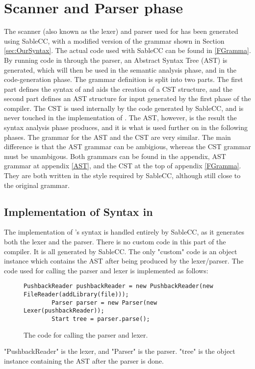 \section{Scanner and Parser phase}

The scanner (also known as the lexer) and parser used for \lang{} has been generated using SableCC, with a modified version of the grammar shown in Section \ref{sec:OurSyntax}. The actual code used with SableCC can be found in \ref{FGramma}. By running code in \lang{} through the parser, an Abstract Syntax Tree (AST) is generated, which will then be used in the semantic analysis phase, and in the code-generation phase.
The grammar definition is split into two parts. The first part defines the syntax of \lang{} and aids the creation of a CST structure, and the second part defines an AST structure for input generated by the first phase of the compiler. The CST is used internally by the code generated by SableCC, and is never touched in the implementation of \lang{}. The AST, however, is the result the syntax analysis phase produces, and it is what is used further on in the following phases. 
The grammar for the AST and the CST are very similar. The main difference is that the AST grammar can be ambigious, whereas the CST grammar must be unambigous. Both grammars can be found in the appendix, AST grammar at appendix \ref{AST}, and the CST at the top of appendix \ref{FGramma}. They are both written in the style required by SableCC, although still close to the original grammar.
\subsection{Implementation of Syntax in \lang{}}
The implementation of \lang{}'s syntax is handled entirely by SableCC, as it generates both the lexer and the parser. There is no custom code in this part of the compiler. It is all generated by SableCC. The only "custom" code is an object instance which contains the AST after being produced by the lexer/parser. The code used for calling the parser and lexer is implemented as follows:
\begin{figure}[H]
    \centering
    
    \begin{lstlisting}[style=gglang]
        PushbackReader pushbackReader = new PushbackReader(new FileReader(addLibrary(file)));
        Parser parser = new Parser(new Lexer(pushbackReader));
        Start tree = parser.parse();
    \end{lstlisting}
    \caption{The code for calling the parser and lexer.\label{fig:parslex}}
\end{figure}
"PushbackReader" is the lexer, and "Parser" is the parser. "tree" is the object instance containing the AST after the parser is done. 